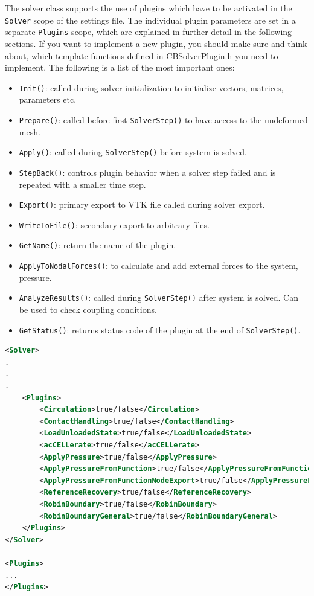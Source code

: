 The solver class supports the use of plugins which have to be activated in the \verb|Solver| scope of the settings file. 
The individual plugin parameters are set in a separate \verb|Plugins| scope, which are explained in further detail in the following sections.
If you want to implement a new plugin, you should make sure and think about, which template functions defined in \href{https://github.com/KIT-IBT/CardioMechanics/blob/main/mechanics/src/CBSolverPlugins/CBSolverPlugin.h}{CBSolverPlugin.h} you need to implement.
The following is a list of the most important ones:
\begin{itemize}
    \item \verb|Init()|: called during solver initialization to initialize vectors, matrices, parameters etc.
    \item \verb|Prepare()|: called before first \verb|SolverStep()| to have access to the undeformed mesh.
    \item \verb|Apply()|: called during \verb|SolverStep()| before system is solved.
    \item \verb|StepBack()|: controls plugin behavior when a solver step failed and is repeated with a smaller time step.
    \item \verb|Export()|: primary export to VTK file called during solver export.
    \item \verb|WriteToFile()|: secondary export to arbitrary files.
    \item \verb|GetName()|: return the name of the plugin.
    \item \verb|ApplyToNodalForces()|: to calculate and add external forces to the system, \eg pressure.
    \item \verb|AnalyzeResults()|: called during \verb|SolverStep()| after system is solved. Can be used to check coupling conditions.
    \item \verb|GetStatus()|: returns status code of the plugin at the end of \verb|SolverStep()|.
\end{itemize}

\begin{lstlisting}[language=XML,caption=.xml settings for solver plugins]
<Solver>
.
.
.
    <Plugins>
        <Circulation>true/false</Circulation>
        <ContactHandling>true/false</ContactHandling>
        <LoadUnloadedState>true/false</LoadUnloadedState>
        <acCELLerate>true/false</acCELLerate>
        <ApplyPressure>true/false</ApplyPressure>
        <ApplyPressureFromFunction>true/false</ApplyPressureFromFunction>
        <ApplyPressureFromFunctionNodeExport>true/false</ApplyPressureFromFunctionNodeExport>
        <ReferenceRecovery>true/false</ReferenceRecovery>
        <RobinBoundary>true/false</RobinBoundary>
        <RobinBoundaryGeneral>true/false</RobinBoundaryGeneral>
    </Plugins>
</Solver>

<Plugins>
...
</Plugins>
\end{lstlisting}

